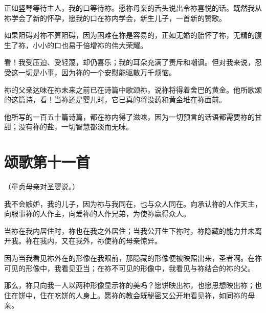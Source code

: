 正如竖琴等待主人，我的口等待祢。愿祢母亲的舌头说出令祢喜悦的话。既然我从祢学会了新的怀孕，愿我的口在祢内学会，新生儿子，一首新的赞歌。\par

如果阻碍对祢不算阻碍，因为困难在祢是容易的，正如无婚的胎怀了祢，无精的腹生了祢，小小的口也易于倍增祢的伟大荣耀。\par

看！我受压迫、受轻蔑，却仍喜乐；我的耳朵充满了责斥和嘲讽。但对我来说，忍受这一切是小事，因为祢的一个安慰能驱散万千烦恼。\par

\par

祢的父亲达味在祢未来之前已在诗篇中歌颂祢，说祢将得着舍巴的黄金。他所歌颂的这篇诗，看！当祢还是婴儿时，它已真的将没药和黄金堆在祢面前。\par

他所写的一百五十篇诗篇，都在祢内得了滋味，因为一切预言的话语都需要祢的甘甜；没有祢的盐，一切智慧都淡而无味。\par


\section{颂歌第十一首}

（童贞母亲对圣婴说。）\par

我不会嫉妒，我的儿子，因为祢与我同在，也与众人同在。向承认祢的人作天主，向服事祢的人作主，向爱祢的人作兄弟，为使祢赢得众人。\par

当祢在我内居住时，祢也在我之外居住；当我公开生下祢时，祢隐藏的能力并未离开我。祢在我内，又在我外，祢使祢的母亲惊异。\par

因为当我看见祢外在的形像在我眼前，那隐藏的形像便被映照出来，圣者啊。在祢可见的形像中，我看见亚当；在祢不可见的形像中，我看见与祢结合的祢的父。\par

那么，祢只向我一人以两种形像显示祢的美吗？愿饼映出祢，也愿思想映出祢；也住在饼中，住在吃饼的人身上。愿祢的教会既秘密又公开地看见祢，如同祢的母亲。\par

